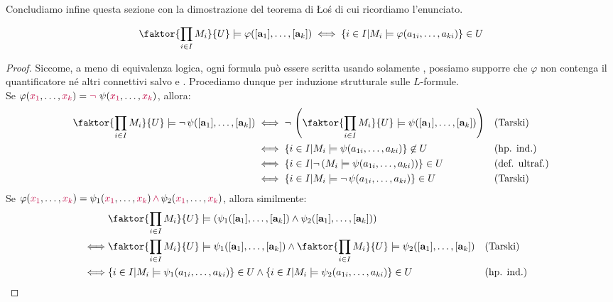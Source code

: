 Concludiamo infine questa sezione con la dimostrazione del teorema di Łoś di cui ricordiamo l'enunciato.

\begin{theorem}
    \[ \faktor{\prod_{i \in I} M_i}{U} \models \varphi([\mathbf a_1],\ldots,[\mathbf a_k]) \iff \{i \in I | M_i \models \varphi(a_{1i},\ldots,a_{ki})\} \in U \]
\end{theorem}

\begin{proof}
    Siccome, a meno di equivalenza logica, ogni formula può essere scritta usando solamente \purple{$\exists,\neg\,\,\land$}, possiamo supporre che $\varphi$ non contenga il quantificatore \purple{$\forall$} né altri connettivi salvo \purple{$\neg\,$} e \purple{$\land$}. Procediamo dunque 
    per induzione strutturale sulle $L$-formule.\\
    Se $\varphi(\textcolor{purple}{x_1},\ldots,\textcolor{purple}{x_k}) = \textcolor{purple}{\neg\,} \,\psi(\textcolor{purple}{x_1},\ldots,\textcolor{purple}{x_k})$, allora:
        \begin{align*}
            \faktor{\prod_{i \in I} M_i}{U} \models \neg\, \psi([\mathbf a_1],\ldots,[\mathbf a_k]) &\iff \neg\, \left(\faktor{\prod_{i \in I} M_i}{U} \models \psi([\mathbf a_1],\ldots,[\mathbf a_k])\right) && \text{(Tarski)} \\
            & \iff \{i \in I | M_i \models \psi(a_{1i},\ldots,a_{ki})\} \not\in U && \text{(hp. ind.)} \\
            & \iff \{i \in I | \neg\, (M_i \models \psi(a_{1i},\ldots,a_{ki}))\} \in U && \text{(def. ultraf.)} \\
            & \iff \{i \in I | M_i \models \neg\,\psi(a_{1i},\ldots,a_{ki})\} \in U && \text{(Tarski)}
        \end{align*}
    Se $\varphi(\textcolor{purple}{x_1},\ldots,\textcolor{purple}{x_k}) = \psi_1(\textcolor{purple}{x_1},\ldots,\textcolor{purple}{x_k}) \, \textcolor{purple}{\land} \, \psi_2(\textcolor{purple}{x_1},\ldots,\textcolor{purple}{x_k})$, allora similmente:
        \begin{align*}
            &\faktor{\prod_{i \in I} M_i}{U} \models (\psi_1([\mathbf a_1],\ldots,[\mathbf a_k]) \land \psi_2([\mathbf a_1],\ldots,[\mathbf a_k])) \\
            \iff& \faktor{\prod_{i \in I} M_i}{U} \models \psi_1([\mathbf a_1],\ldots,[\mathbf a_k]) \land \faktor{\prod_{i \in I} M_i}{U} \models \psi_2([\mathbf a_1],\ldots,[\mathbf a_k]) && \text{(Tarski)} \\
            \iff& \{i \in I | M_i \models \psi_1(a_{1i},\ldots,a_{ki})\} \in U \land \{i \in I | M_i \models \psi_2(a_{1i},\ldots,a_{ki})\} \in U && \text{(hp. ind.)} \\

\end{align*}
\end{proof}
